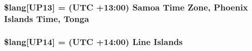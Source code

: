 \subsubsection[{\$lang}]{\setlength{\rightskip}{0pt plus 5cm}\$lang\mbox{[}\textquotesingle{}U\+P13\textquotesingle{}\mbox{]} = \textquotesingle{}(U\+T\+C +13\+:00) Samoa Time Zone, Phoenix Islands Time, Tonga\textquotesingle{}}\label{_admin_2system_2language_2english_2date__lang_8php_ac197fec09ff547ca12a7fe3ffc5908ae}
\hypertarget{_admin_2system_2language_2english_2date__lang_8php_a50562230c497ebdba1f540d409110fce}{}
\subsubsection[{\$lang}]{\setlength{\rightskip}{0pt plus 5cm}\$lang\mbox{[}\textquotesingle{}U\+P14\textquotesingle{}\mbox{]} = \textquotesingle{}(U\+T\+C +14\+:00) Line Islands\textquotesingle{}}\label{_admin_2system_2language_2english_2date__lang_8php_a50562230c497ebdba1f540d409110fce}
